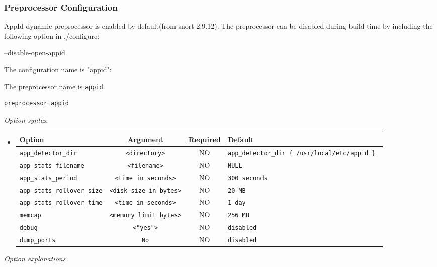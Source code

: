 \documentclass[english]{report}
\begin{document}
\subsubsection{Preprocessor Configuration}
AppId dynamic preprocessor is enabled by default(from snort-2.9.12).
The preprocessor can be disabled during build time by including the following option in ./configure:

--disable-open-appid

The configuration name is "appid":

The preprocessor name is \texttt{appid}.
\begin{verbatim}
preprocessor appid
\end{verbatim}
\textit{Option syntax}
\begin{itemize}
\item[]
\begin{tabular}{|l|c|c|p{6cm}|}
\hline
Option & Argument & Required & Default\\
\hline
\hline
\texttt{app\_detector\_dir} & \texttt{<directory>} & NO & \texttt{app\_detector\_dir \{ /usr/local/etc/appid \} }\\
\texttt{app\_stats\_filename} & \texttt{<filename>} & NO & \texttt{NULL}\\
\texttt{app\_stats\_period} & \texttt{<time in seconds>} & NO & \texttt{300 seconds}\\
\texttt{app\_stats\_rollover\_size} & \texttt{<disk size in bytes>} & NO & \texttt{20 MB}\\
\texttt{app\_stats\_rollover\_time} & \texttt{<time in seconds>} & NO & \texttt{1 day}\\
\texttt{memcap} & \texttt{<memory limit bytes>} & NO & \texttt{256 MB}\\
\texttt{debug} & \texttt{<"yes">} & NO & \texttt{disabled}\\
\texttt{dump\_ports} & \texttt{No} & NO & \texttt{disabled}\\
\hline
\end{tabular}
\end{itemize}
\normalsize
\textit{Option explanations}
\end{document}
